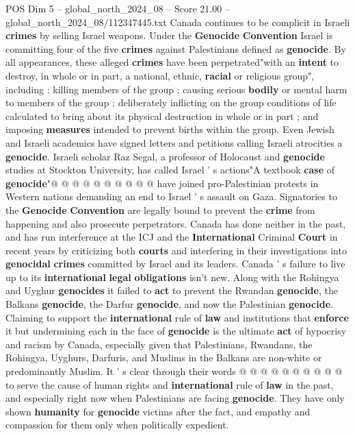 \begin{textsample}{POS Dim 5 – global\_north\_2024\_08 – Score 21.00 – global\_north\_2024\_08/112347445.txt}
Canada continues to be complicit in Israeli \textbf{crimes} by selling Israel weapons.
Under the \textbf{Genocide} \textbf{Convention} Israel is committing four of the five \textbf{crimes} against Palestinians defined as \textbf{genocide}.
By all appearances, these alleged \textbf{crimes} have been perpetrated"with an \textbf{intent} to destroy, in whole or in part, a national, ethnic, \textbf{racial} or religious group", including : killing members of the group ; causing serious \textbf{bodily} or mental harm to members of the group ; deliberately inflicting on the group conditions of life calculated to bring about its physical destruction in whole or in part ; and imposing \textbf{measures} intended to prevent births within the group.
Even Jewish and Israeli academics have signed letters and petitions calling Israeli atrocities a \textbf{genocide}.
Israeli scholar Raz Segal, a professor of Holocaust and \textbf{genocide} studies at Stockton University, has called Israel ' s actions"A textbook \textbf{case} of \textbf{genocide}"@ @ @ @ @ @ @ @ @ @ have joined pro-Palestinian protests in Western nations demanding an end to Israel ' s assault on Gaza.
Signatories to the \textbf{Genocide} \textbf{Convention} are legally bound to prevent the \textbf{crime} from happening and also prosecute perpetrators.
Canada has done neither in the past, and has run interference at the ICJ and the \textbf{International} Criminal \textbf{Court} in recent years by criticizing both \textbf{courts} and interfering in their investigations into \textbf{genocidal} \textbf{crimes} committed by Israel and its leaders.
Canada ' s failure to live up to its \textbf{international} \textbf{legal} \textbf{obligations} isn't new.
Along with the Rohingya and Uyghur \textbf{genocides} it failed to \textbf{act} to prevent the Rwandan \textbf{genocide}, the Balkans \textbf{genocide}, the Darfur \textbf{genocide}, and now the Palestinian \textbf{genocide}.
Claiming to support the \textbf{international} rule of \textbf{law} and institutions that \textbf{enforce} it but undermining each in the face of \textbf{genocide} is the ultimate \textbf{act} of hypocrisy and racism by Canada, especially given that Palestinians, Rwandans, the Rohingya, Uyghurs, Darfuris, and Muslims in the Balkans are non-white or predominantly Muslim.
It ' s clear through their words @ @ @ @ @ @ @ @ @ @ to serve the cause of human rights and \textbf{international} rule of \textbf{law} in the past, and especially right now when Palestinians are facing \textbf{genocide}.
They have only shown \textbf{humanity} for \textbf{genocide} victims after the fact, and empathy and compassion for them only when politically expedient.

\end{textsample}
